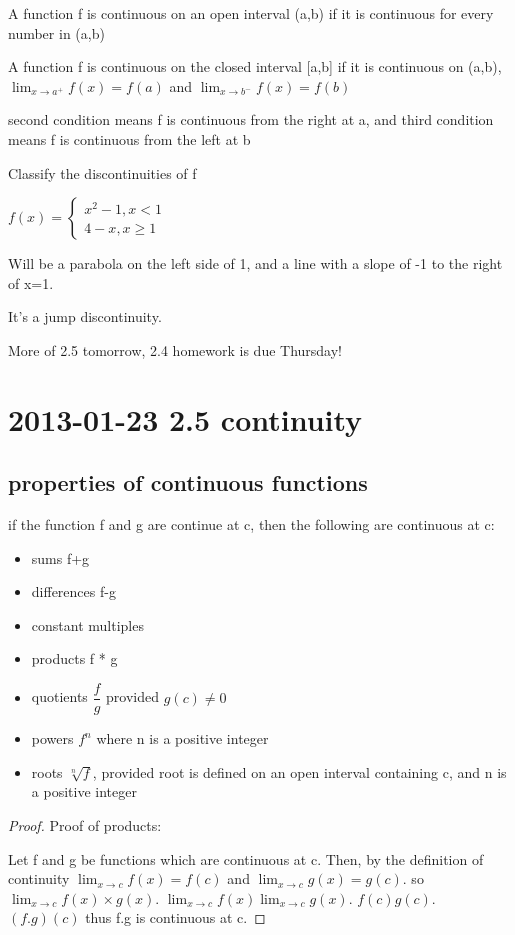 \documentclass[12pt]{article}
\begin{document}
A function f is continuous on an open interval (a,b) if it is continuous for every number in (a,b)

A function f is continuous on the closed interval [a,b] if it is continuous on (a,b),$\lim_{x \to a^+}f(x) =
f(a)$ and $\lim_{x \to b^-}f(x) = f(b)$

second condition means f is continuous from the right at a, and third condition means f is continuous from the
left at b

Classify the discontinuities of f

$f(x) = \left\{\begin{array}{l}
x^2-1,x < 1\\
4-x, x \geq 1
\end{array} \right. $

Will be a parabola on the left side of 1, and a line with a slope of -1 to the right of x=1.

It's a jump discontinuity.


More of 2.5 tomorrow, 2.4 homework is due Thursday!



\section{2013-01-23 2.5 continuity}

\subsection{properties of continuous functions}

if the function f and g are continue at c, then the following are continuous at c:
\begin{itemize}
\item sums f+g
\item differences f-g
\item constant multiples
\item products f * g
\item quotients $\dfrac{f}{g}$ provided $g(c) \neq 0$
\item powers $f^n$ where n is a positive integer
\item roots $\sqrt[n]{f}$, provided root is defined on an open interval containing c, and n is a positive integer
\end{itemize}

\begin{proof}
Proof of products:

Let f and g be functions which are continuous at c.
Then, by the definition of continuity $\lim_{x \to c}f(x)=f(c)$ and $\lim_{x \to c}g(x)=g(c)$.
so $\lim_{x \to c} f(x) \times g(x)$.
 $\lim_{x \to c} f(x) \lim_{x \to c} g(x)$.
 $f(c) g(c)$.
$(f . g) (c)$
thus f.g is continuous at c.

\end{proof}
\end{document}
